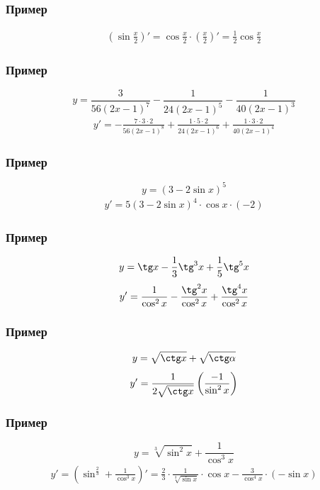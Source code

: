 \documentclass{article}
\begin{document}
\subsubsection{Пример}
\begin{gather*}
    \left( \sin \frac{x}{2} \right)' = \cos \frac{x}{2} \cdot \left( \frac{x}{2} \right)' = \frac{1}{2} \cos \frac{x}{2}
\end{gather*}

\subsubsection{Пример}
\[
    y = \frac{3}{56(2x - 1)^7} - \frac{1}{24(2x - 1)^5} - \frac{1}{40(2x - 1)^3}
\]
\begin{gather*}
    y' = -\frac{7 \cdot 3 \cdot 2}{56(2x - 1)^8} + \frac{1 \cdot 5 \cdot 2}{24(2x - 1)^6} + \frac{1 \cdot 3 \cdot 2}{40(2x - 1)^4}
\end{gather*}

\subsubsection{Пример}
\[
    y = (3 - 2\sin x)^5
\]
\begin{gather*}
    y' = 5(3 - 2\sin x)^4 \cdot \cos x \cdot (-2)   
\end{gather*}

\subsubsection{Пример}
\[
    y = \tg x - \frac{1}{3} \tg^3 x + \frac{1}{5} \tg^5 x
\]
\begin{gather*}
    y' = \frac{1}{\cos^2 x} - \frac{\tg^2 x}{\cos^2 x} + \frac{\tg^4 x}{\cos^2 x}
\end{gather*}

\subsubsection{Пример}
\[
    y = \sqrt{\ctg x} + \sqrt{\ctg \alpha}
\]
\begin{gather*}
    y' = \frac{1}{2 \sqrt{\ctg x}} \left( \frac{-1}{\sin^2 x} \right)
\end{gather*}

\subsubsection{Пример}
\[
    y = \sqrt[3]{\sin^2 x} + \frac{1}{\cos^3 x}
\]
\begin{gather*}
    y' = \left( \sin^{\frac{2}{3}} + \frac{1}{\cos^3 x} \right)' = 
    \frac{2}{3} \cdot \frac{1}{\sqrt[3]{\sin x}} \cdot \cos x - \frac{3}{\cos^4 x} \cdot (-\sin x)
\end{gather*}
\end{document}
